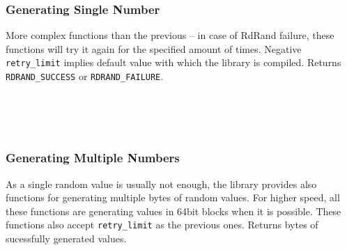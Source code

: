 \\

\\

\\

\subsubsection{Generating Single Number}\label{subsec:api:single-number}
\par{
More complex functions than the previous -- in case of RdRand failure, these functions will try it again for the specified amount of times. Negative {\tt retry\_limit} implies default value with which the library is compiled. Returns {\tt RDRAND\_SUCCESS} or {\tt RDRAND\_FAILURE}.\\
}

\\

\\

\\

\subsubsection{Generating Multiple Numbers}\label{subsec:api:multiple}
\par{
As a single random value is usually not enough, the library provides also functions for generating multiple bytes of random values. For higher speed, all these functions are generating values in 64bit blocks when it is possible.
These functions also accept {\tt retry\_limit} as the previous ones. Returns bytes of sucessfully generated values.\\
}

\\


